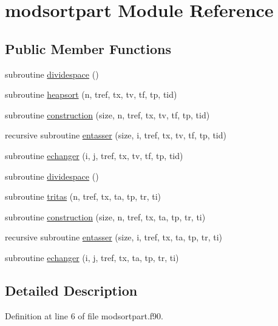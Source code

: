 \hypertarget{classmodsortpart}{\section{modsortpart Module Reference}
\label{classmodsortpart}
}
\subsection*{Public Member Functions}
\begin{DoxyCompactItemize}
\item 
subroutine \hyperlink{classmodsortpart_a45cee800346ecf7b0cdc0c235bd06c48}{dividespace} ()
\item 
subroutine \hyperlink{classmodsortpart_aa3fa8de94821d20599528fffd223a0b1}{heapsort} (n, tref, tx, tv, tf, tp, tid)
\item 
subroutine \hyperlink{classmodsortpart_a22ac7a574e86139261a41a3380b63b5a}{construction} (size, n, tref, tx, tv, tf, tp, tid)
\item 
recursive subroutine \hyperlink{classmodsortpart_a5d085df72d2f718f2b8d37a434a5511d}{entasser} (size, i, tref, tx, tv, tf, tp, tid)
\item 
subroutine \hyperlink{classmodsortpart_a8c03f207ba984156927802e30e176e56}{echanger} (i, j, tref, tx, tv, tf, tp, tid)
\item 
subroutine \hyperlink{classmodsortpart_a45cee800346ecf7b0cdc0c235bd06c48}{dividespace} ()
\item 
subroutine \hyperlink{classmodsortpart_a1a6a9f53783f2139141e9064f49d2f1b}{tritas} (n, tref, tx, ta, tp, tr, ti)
\item 
subroutine \hyperlink{classmodsortpart_a18d32ea34d090d81f8f618e593860e72}{construction} (size, n, tref, tx, ta, tp, tr, ti)
\item 
recursive subroutine \hyperlink{classmodsortpart_a237cc515810e4aa5203ebead3f59a3a7}{entasser} (size, i, tref, tx, ta, tp, tr, ti)
\item 
subroutine \hyperlink{classmodsortpart_a0b24fe38ef401030203a179425190ba9}{echanger} (i, j, tref, tx, ta, tp, tr, ti)
\end{DoxyCompactItemize}


\subsection{Detailed Description}


Definition at line 6 of file modsortpart.\-f90.



